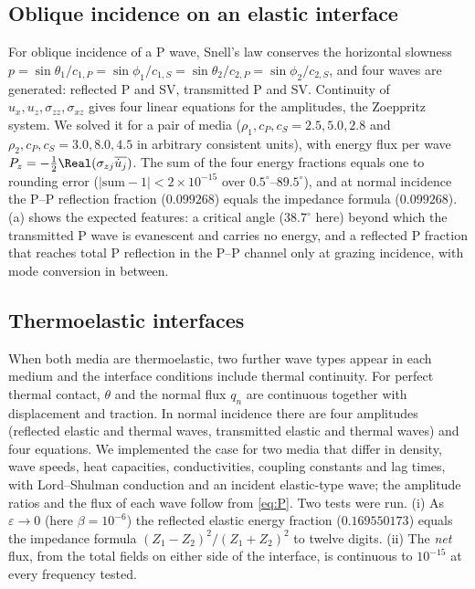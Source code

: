 \subsection{Oblique incidence on an elastic interface}
For oblique incidence of a P wave, Snell's law conserves the horizontal slowness $p=\sin\theta_1/c_{1,P}=\sin\phi_1/c_{1,S}=\sin\theta_2/c_{2,P}=\sin\phi_2/c_{2,S}$, and four waves are generated: reflected P and SV, transmitted P and SV. Continuity of $u_x,u_z,\sigma_{zz},\sigma_{xz}$ gives four linear equations for the amplitudes, the Zoeppritz system. We solved it for a pair of media ($\rho_1,c_P,c_S=2.5,5.0,2.8$ and $\rho_2,c_P,c_S=3.0,8.0,4.5$ in arbitrary consistent units), with energy flux per wave $P_z=-\tfrac12\Real(\sigma_{zj}\overline{\dot u_j})$. The sum of the four energy fractions equals one to rounding error ($|\text{sum}-1|<2\times10^{-15}$ over $0.5^\circ$--$89.5^\circ$), and at normal incidence the P--P reflection fraction ($0.099268$) equals the impedance formula ($0.099268$). (a) shows the expected features: a critical angle ($38.7^\circ$ here) beyond which the transmitted P wave is evanescent and carries no energy, and a reflected P fraction that reaches total P reflection in the P--P channel only at grazing incidence, with mode conversion in between.

\subsection{Thermoelastic interfaces}
When both media are thermoelastic, two further wave types appear in each medium and the interface conditions include thermal continuity. For perfect thermal contact, $\theta$ and the normal flux $q_n$ are continuous together with displacement and traction. In normal incidence there are four amplitudes (reflected elastic and thermal waves, transmitted elastic and thermal waves) and four equations. We implemented the case for two media that differ in density, wave speeds, heat capacities, conductivities, coupling constants and lag times, with Lord--Shulman conduction and an incident elastic-type wave; the amplitude ratios and the flux of each wave follow from \eqref{eq:P}. Two tests were run. (i) As $\varepsilon\to0$ (here $\beta=10^{-6}$) the reflected elastic energy fraction ($0.169550173$) equals the impedance formula $(Z_1-Z_2)^2/(Z_1+Z_2)^2$ to twelve digits. (ii) The \emph{net} flux, from the total fields on either side of the interface, is continuous to $10^{-15}$ at every frequency tested.

